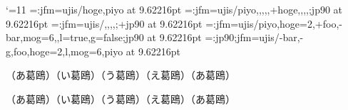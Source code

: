 
\catcode`\@=11
\jfont \testA=\ltj@stdmcfont:jfm=ujis/hoge,piyo at 9.62216pt
\jfont \testB=\ltj@stdmcfont:jfm=ujis/{piyo,,,,,+hoge,,,,};jp90 at 9.62216pt
\jfont \testC=\ltj@stdgtfont:jfm=ujis/,,,,;+jp90 at 9.62216pt
\jfont \testE=\ltj@stdmcfont:jfm=ujis/piyo,hoge=2,+foo,-bar,mog=6,,l=true,g=false;jp90 at 9.62216pt
\jfont \testE=\ltj@stdmcfont:jp90;jfm=ujis/{-bar,-g,foo,hoge=2,l,mog=6,piyo} at 9.62216pt



{\testA （あ葛鴎）}{\testB （い葛鴎）}{\testC （う葛鴎）}（え葛鴎）{\tengt（あ葛鴎）}\par

{\testA （あ葛鴎）}{\testB （い葛鴎）}{\testC （う葛鴎）}（え葛鴎）{\tengt（あ葛鴎）}\par

\bye
